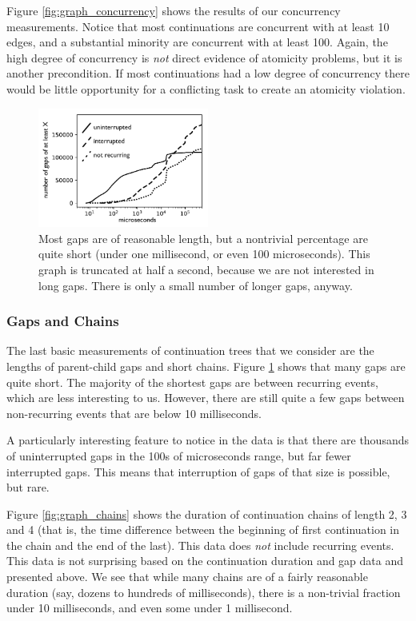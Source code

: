 \documentclass[acmsmall,anonymous,review]{acmart}\settopmatter{printfolios=true,printccs=false,printacmref=false}
\begin{document}
Figure \ref{fig:graph_concurrency} shows the results of our concurrency measurements.
Notice that most continuations are concurrent with at least 10 edges, and a substantial minority are concurrent with at least 100.
Again, the high degree of concurrency is \emph{not} direct evidence of atomicity problems, but it is another precondition.
If most continuations had a low degree of concurrency there would be little opportunity for a conflicting task to create an atomicity violation.

\begin{figure}
\hspace*{-0.2cm}\includegraphics[width=0.5\textwidth]{gaps_graph_bw}
\caption{Most gaps are of reasonable length, but a nontrivial percentage are quite short (under one millisecond, or even 100 microseconds).
  This graph is truncated at half a second, because we are not interested in long gaps.
  There is only a small number of longer gaps, anyway.}
\label{fig:graph_gaps}
\end{figure}

\subsubsection{Gaps and Chains}

The last basic measurements of continuation trees that we consider are the lengths of parent-child gaps and short chains.
Figure \ref{fig:graph_gaps} shows that many gaps are quite short.
The majority of the shortest gaps are between recurring events, which are less interesting to us.
However, there are still quite a few gaps between non-recurring events that are below 10 milliseconds.

A particularly interesting feature to notice in the data is that there are thousands of uninterrupted gaps in the 100s of microseconds range, but far fewer interrupted gaps.
This means that interruption of gaps of that size is possible, but rare.

Figure \ref{fig:graph_chains} shows the duration of continuation chains of length 2, 3 and 4 (that is, the time difference between the beginning of first continuation in the chain and the end of the last).
This data does \emph{not} include recurring events.
This data is not surprising based on the continuation duration and gap data and presented above.
We see that while many chains are of a fairly reasonable duration (say, dozens to hundreds of milliseconds), there is a non-trivial fraction under 10 milliseconds, and even some under 1 millisecond.
\end{document}
